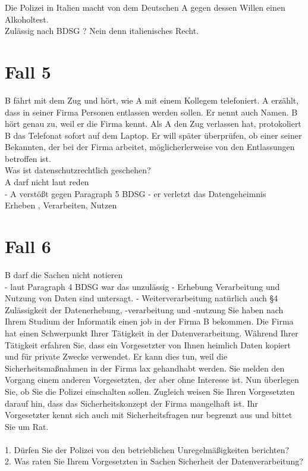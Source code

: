 \documentclass[a4paper,10pt]{scrartcl}
\begin{document}
Die Polizei in Italien macht von dem Deutschen A gegen dessen Willen einen
Alkoholtest. \\
Zulässig nach BDSG ?
Nein denn italienisches Recht.

\section{Fall 5}
B fährt mit dem Zug und hört, wie A mit einem Kollegem telefoniert. A erzählt,
dass in seiner Firma Personen entlassen werden sollen. Er nennt auch Namen.
B hört genau zu, weil er die Firma kennt. Als A den Zug verlassen hat,
protokoliert B das Telefonat sofort auf dem Laptop. Er will später überprüfen,
ob einer seiner Bekannten, der bei der Firma arbeitet, möglicherlerweise von den
Entlassungen betroffen ist. \\

Was ist datenschutzrechtlich geschehen? \\

A darf nicht laut reden \\

- A verstößt gegen Paragraph 5 BDSG - er verletzt das Datengeheimnis\\

Erheben , Verarbeiten, Nutzen

\section{Fall 6}


B darf die Sachen nicht notieren\\
- laut Paragraph 4 BDSG war das unzulässig - Erhebung Verarbeitung und Nutzung
von Daten sind untersagt. - Weiterverarbeitung natürlich auch
§4 Zulässigkeit der Datenerhebung, -verarbeitung und -nutzung Sie haben nach Ihrem Studium der Informatik einen job in der Firma B bekommen. Die 
Firma hat einen Schwerpunkt Ihrer Tätigkeit in der Datenverarbeitung. Während Ihrer 
Tätigkeit erfahren Sie, dass ein Vorgesetzter von Ihnen heimlich Daten kopiert und 
für private Zwecke verwendet. Er kann dies tun, weil die Sicherheitsmaßnahmen in 
der Firma lax gehandhabt werden. Sie melden den Vorgang einem anderen 
Vorgesetzten, der aber ohne Interesse ist. Nun überlegen Sie, ob Sie die Polizei 
einschalten sollen. Zugleich weisen Sie Ihren Vorgesetzten darauf hin, dass das 
Sicherheitskonzept der Firma mangelhaft ist. Ihr Vorgesetzter kennt sich auch mit 
Sicherheitsfragen nur begrenzt aus und bittet Sie um Rat. \\
\\
1. Dürfen Sie der Polizei von den betrieblichen Unregelmäßigkeiten berichten?\\
2. Was raten Sie Ihrem Vorgesetzten in Sachen Sicherheit der Datenverarbeitung?\\
\end{document}
